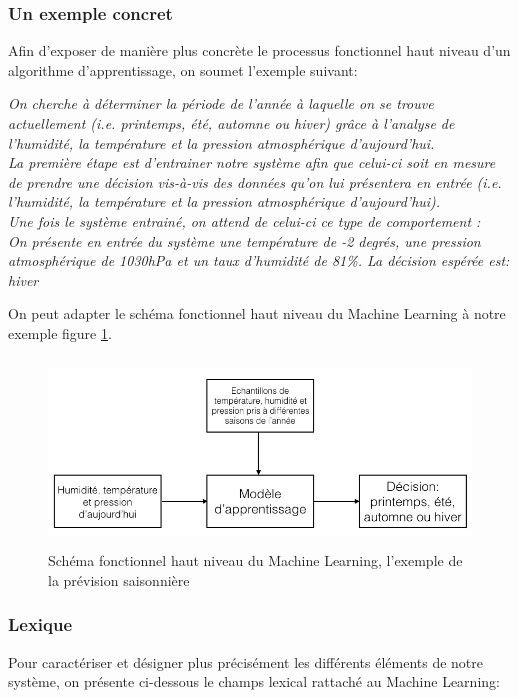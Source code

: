 \subsubsection{Un exemple concret}
\label{Le Machine Learning: Généralités sur le Machine Learning: Définition et principe général:un exemple concret}
Afin d'exposer de manière plus concrète le processus fonctionnel haut niveau d'un algorithme d'apprentissage, on soumet l'exemple suivant:

\textit{On cherche à déterminer la période de l'année à laquelle on se trouve actuellement (i.e. printemps, été, automne ou hiver) grâce à l'analyse de l'humidité, la température et la pression atmosphérique d'aujourd'hui. \\
	La première étape est d'entrainer notre système afin que celui-ci soit en mesure de prendre une décision vis-à-vis des données qu'on lui présentera en entrée (i.e. l'humidité, la température et la pression atmosphérique d'aujourd'hui). \\
	Une fois le système entrainé, on attend de celui-ci ce type de comportement : \\
	On présente en entrée du système une température de -2 degrés, une pression atmosphérique de 1030hPa et un taux d'humidité de 81\%. La décision espérée est: \emph{hiver}}

On peut adapter le schéma fonctionnel haut niveau du Machine Learning à notre exemple figure \ref{fig:Schéma fonctionnel haut niveau du Machine Learning, l'exemple prévision saisonnière}. 

\begin{figure}[h]
	\centering\includegraphics[height=5cm]{images/ML_high_level_expl.jpeg}
	\caption{Schéma fonctionnel haut niveau du Machine Learning, l'exemple de la prévision saisonnière}
	\label{fig:Schéma fonctionnel haut niveau du Machine Learning, l'exemple prévision saisonnière}
\end{figure}

\subsubsection{Lexique} 
Pour caractériser et  désigner plus précisément les différents éléments de notre système, on présente ci-dessous le champs lexical rattaché au Machine Learning:

